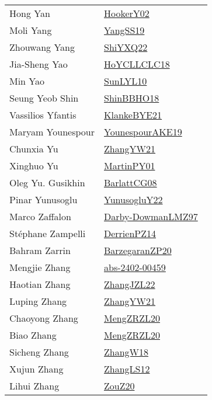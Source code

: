 {\begin{longtable}{p{4cm}p{20cm}}
Hong Yan & \href{works/HookerY02.pdf}{HookerY02}~\cite{HookerY02}\\
Moli Yang & \href{works/YangSS19.pdf}{YangSS19}~\cite{YangSS19}\\
Zhouwang Yang & \href{}{ShiYXQ22}~\cite{ShiYXQ22}\\
Jia{-}Sheng Yao & \href{works/HoYCLLCLC18.pdf}{HoYCLLCLC18}~\cite{HoYCLLCLC18}\\
Min Yao & \href{works/SunLYL10.pdf}{SunLYL10}~\cite{SunLYL10}\\
Seung Yeob Shin & \href{works/ShinBBHO18.pdf}{ShinBBHO18}~\cite{ShinBBHO18}\\
Vassilios Yfantis & \href{works/KlankeBYE21.pdf}{KlankeBYE21}~\cite{KlankeBYE21}\\
Maryam Younespour & \href{works/YounespourAKE19.pdf}{YounespourAKE19}~\cite{YounespourAKE19}\\
Chunxia Yu & \href{works/ZhangYW21.pdf}{ZhangYW21}~\cite{ZhangYW21}\\
Xinghuo Yu & \href{works/MartinPY01.pdf}{MartinPY01}~\cite{MartinPY01}\\
Oleg Yu. Gusikhin & \href{works/BarlattCG08.pdf}{BarlattCG08}~\cite{BarlattCG08}\\
Pinar Yunusoglu & \href{works/YunusogluY22.pdf}{YunusogluY22}~\cite{YunusogluY22}\\
Marco Zaffalon & \href{works/Darby-DowmanLMZ97.pdf}{Darby-DowmanLMZ97}~\cite{Darby-DowmanLMZ97}\\
St{\'{e}}phane Zampelli & \href{works/DerrienPZ14.pdf}{DerrienPZ14}~\cite{DerrienPZ14}\\
Bahram Zarrin & \href{works/BarzegaranZP20.pdf}{BarzegaranZP20}~\cite{BarzegaranZP20}\\
Mengjie Zhang & \href{works/abs-2402-00459.pdf}{abs-2402-00459}~\cite{abs-2402-00459}\\
Haotian Zhang & \href{works/ZhangJZL22.pdf}{ZhangJZL22}~\cite{ZhangJZL22}\\
Luping Zhang & \href{works/ZhangYW21.pdf}{ZhangYW21}~\cite{ZhangYW21}\\
Chaoyong Zhang & \href{works/MengZRZL20.pdf}{MengZRZL20}~\cite{MengZRZL20}\\
Biao Zhang & \href{works/MengZRZL20.pdf}{MengZRZL20}~\cite{MengZRZL20}\\
Sicheng Zhang & \href{works/ZhangW18.pdf}{ZhangW18}~\cite{ZhangW18}\\
Xujun Zhang & \href{works/ZhangLS12.pdf}{ZhangLS12}~\cite{ZhangLS12}\\
Lihui Zhang & \href{works/ZouZ20.pdf}{ZouZ20}~\cite{ZouZ20}\\

\end{longtable}}
